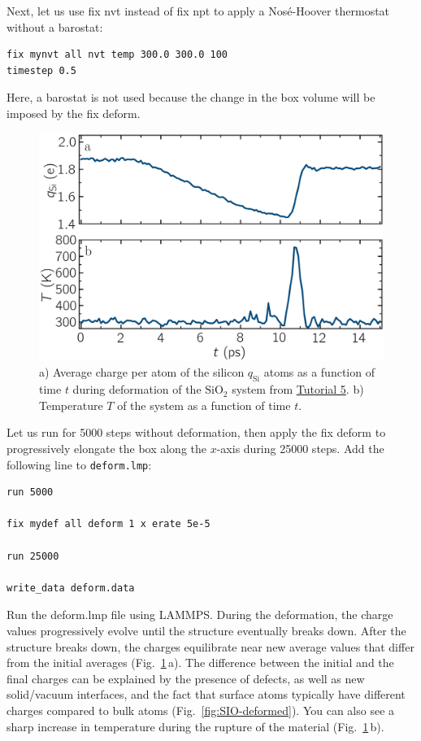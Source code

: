 \documentclass[9pt,tutorial]{livecoms}
\newcommand{\lmpcmd}[1]{\hspace{0pt}\colorbox{listing}{\textcolor{command}{\small{#1}}}\hspace{0pt}} %
\newcommand{\flecmd}[1]{\textcolor{command}{\texttt{#1}}} %
\begin{document}
Next, let us use \lmpcmd{fix nvt} instead of \lmpcmd{fix npt} to apply a
Nosé-Hoover thermostat without a barostat:
\begin{lstlisting}
fix mynvt all nvt temp 300.0 300.0 100
timestep 0.5
\end{lstlisting}
Here, a barostat is not used because the change in the box volume will be imposed
by the \lmpcmd{fix deform}.

\begin{figure}
\includegraphics[width=\linewidth]{SIO-deformed-charge}
\caption{a) Average charge per atom of the silicon $q_\text{Si}$ atoms as
a function of time $t$ during deformation of the $\text{SiO}_2$ system
from \hyperref[reactive-silicon-dioxide-label]{Tutorial 5}.  b) Temperature $T$ of the
system as a function of time $t$.}
\label{fig:SIO-deformed-charge}
\end{figure}

Let us run for 5000 steps without deformation, then apply the \lmpcmd{fix deform}
to progressively elongate the box along the $x$-axis during 25000 steps.  Add
the following line to \flecmd{deform.lmp}:
\begin{lstlisting}
run 5000

fix mydef all deform 1 x erate 5e-5

run 25000

write_data deform.data
\end{lstlisting}
Run the \lmpcmd{deform.lmp} file using LAMMPS.  During the deformation, the charge
values progressively evolve until the structure eventually breaks down.  After the
structure breaks down, the charges equilibrate near new average values that differ
from the initial averages (Fig.~\ref{fig:SIO-deformed-charge}\,a).  The difference
between the initial and the final charges can be explained by the presence of
defects, as well as new solid/vacuum interfaces, and the fact that surface atoms
typically have different charges compared to bulk atoms (Fig.~\ref{fig:SIO-deformed}).
You can also see a sharp increase in temperature during the rupture of
the material (Fig.~\ref{fig:SIO-deformed-charge}\,b).
\end{document}
